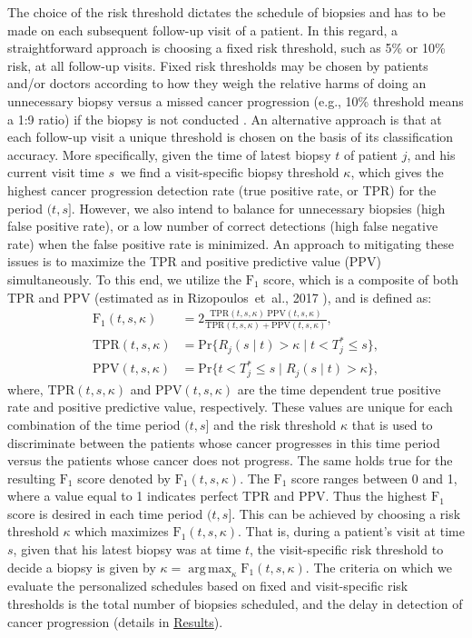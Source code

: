 \documentclass[a4paper, 12pt]{article}
\DeclareMathOperator{\argmax}{arg\,max}
\begin{document}
The choice of the risk threshold dictates the schedule of biopsies and has to be made on each subsequent follow-up visit of a patient. In this regard, a straightforward approach is choosing a fixed risk threshold, such as 5\% or 10\% risk, at all follow-up visits. Fixed risk thresholds may be chosen by patients and/or doctors according to how they weigh the relative harms of doing an unnecessary biopsy versus a missed cancer progression (e.g., 10\% threshold means a 1:9 ratio) if the biopsy is not conducted \citep{vickers2006decision}. An alternative approach is that at each follow-up visit a unique threshold is chosen on the basis of its classification accuracy. More specifically, given the time of latest biopsy $t$ of patient $j$, and his current visit time $s$\, we find a visit-specific biopsy threshold $\kappa$, which gives the highest cancer progression detection rate (true positive rate, or TPR) for the period $(t, s]$. However, we also intend to balance for unnecessary biopsies (high false positive rate), or a low number of correct detections (high false negative rate) when the false positive rate is minimized. An approach to mitigating these issues is to maximize the TPR and positive predictive value (PPV) simultaneously. To this end, we utilize the $\mbox{F}_1$ score, which is a composite of both TPR and PPV (estimated as in Rizopoulos~et~al., 2017 \cite{landmarking2017}), and is defined as: 
\begin{equation}
\label{eq:F1_TPR_PPV}
\begin{split}
\mbox{F}_1(t,  s, \kappa) &= 2\frac{\mbox{TPR}(t,  s, \kappa)\ \mbox{PPV}(t,  s, \kappa)}{\mbox{TPR}(t,  s, \kappa) + \mbox{PPV}(t,  s, \kappa)},\\
\mbox{TPR}(t,  s, \kappa) &= \mbox{Pr}\big\{R_j(s \mid t) > \kappa \mid t < T^*_j \leq s\big\},\\
\mbox{PPV}(t,  s, \kappa) &= \mbox{Pr}\big\{t < T^*_j \leq s \mid R_j(s \mid t) > \kappa \big\},
\end{split}
\end{equation}
where, $\mbox{TPR}(t,  s, \kappa)$ and $\mbox{PPV}(t,  s, \kappa)$ are the time dependent true positive rate and positive predictive value, respectively. These values are unique for each combination of the time period $(t, s]$ and the risk threshold $\kappa$ that is used to discriminate between the patients whose cancer progresses in this time period versus the patients whose cancer does not progress. The same holds true for the resulting $\mbox{F}_1$ score denoted by $\mbox{F}_1(t,  s, \kappa)$. The $\mbox{F}_1$ score ranges between 0 and 1, where a value equal to 1 indicates perfect TPR and PPV. Thus the highest $\mbox{F}_1$ score is desired in each time period $(t, s]$. This can be achieved by choosing a risk threshold $\kappa$ which maximizes $\mbox{F}_1(t, s, \kappa)$. That is, during a patient's visit at time $s$, given that his latest biopsy was at time $t$, the visit-specific risk threshold to decide a biopsy is given by ${\kappa=\argmax_{\kappa} \mbox{F}_1(t, s, \kappa)}$. The criteria on which we evaluate the personalized schedules based on fixed and visit-specific risk thresholds is the total number of biopsies scheduled, and the delay in detection of cancer progression (details in \hyperref[sec:results]{Results}). 
\end{document}
